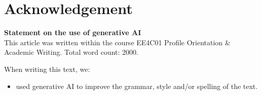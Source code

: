 \documentclass[conference,a4paper]{IEEEtran}
\begin{document}








\section*{Acknowledgement}
\small
\textbf{Statement on the use of generative AI}\\
This article was written within the course EE4C01 Profile Orientation \& Academic Writing. Total word count: 2000.

When writing this text, we:
\begin{itemize}
    \item used generative AI to improve the grammar, style and/or spelling of the text.
\end{itemize}
\normalsize


\end{document}
